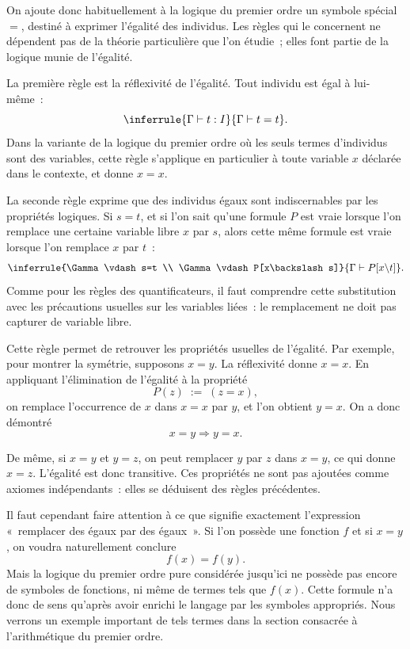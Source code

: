 On ajoute donc habituellement à la logique du premier ordre un symbole
spécial $=$, destiné à exprimer l'égalité des individus.  Les règles qui
le concernent ne dépendent pas de la théorie particulière que l'on
étudie ; elles font partie de la logique munie de l'égalité.

\thingy
La première règle est la réflexivité de l'égalité.  Tout individu est
égal à lui-même :
\[
\inferrule
  {\Gamma\vdash t:I}
  {\Gamma\vdash t=t}.
\]
Dans la variante de la logique du premier ordre où les seuls termes
d'individus sont des variables, cette règle s'applique en particulier à
toute variable $x$ déclarée dans le contexte, et donne $x=x$.

\thingy
La seconde règle exprime que des individus égaux sont
indiscernables par les propriétés logiques.  Si $s=t$, et si l'on sait
qu'une formule $P$ est vraie lorsque l'on remplace une certaine variable
libre $x$ par $s$, alors cette même formule est vraie lorsque l'on
remplace $x$ par $t$ :
\[
\inferrule
  {\Gamma\vdash s=t
   \\
   \Gamma\vdash P[x\backslash s]}
  {\Gamma\vdash P[x\backslash t]}.
\]
Comme pour les règles des quantificateurs, il faut comprendre cette
substitution avec les précautions usuelles sur les variables liées : le
remplacement ne doit pas capturer de variable libre.


\thingy
Cette règle permet de retrouver les propriétés usuelles de l'égalité.
Par exemple, pour montrer la symétrie, supposons $x=y$.  La réflexivité
donne $x=x$.  En appliquant l'élimination de l'égalité à la propriété
\[
P(z)\;:=\;(z=x),
\]
on remplace l'occurrence de $x$ dans $x=x$ par $y$, et l'on obtient
$y=x$.  On a donc démontré
\[
x=y\Rightarrow y=x.
\]

De même, si $x=y$ et $y=z$, on peut remplacer $y$ par $z$ dans
$x=y$, ce qui donne $x=z$.  L'égalité est donc transitive.  Ces
propriétés ne sont pas ajoutées comme axiomes indépendants : elles se
déduisent des règles précédentes.

\thingy
Il faut cependant faire attention à ce que signifie exactement
l'expression « remplacer des égaux par des égaux ».  Si l'on possède une
fonction $f$ et si $x=y$, on voudra naturellement conclure
\[
f(x)=f(y).
\]
Mais la logique du premier ordre pure considérée jusqu'ici ne possède
pas encore de symboles de fonctions, ni même de termes tels que $f(x)$.
Cette formule n'a donc de sens qu'après avoir enrichi le langage par les
symboles appropriés.  Nous verrons un exemple important de tels termes
dans la section consacrée à l'arithmétique du premier ordre.

